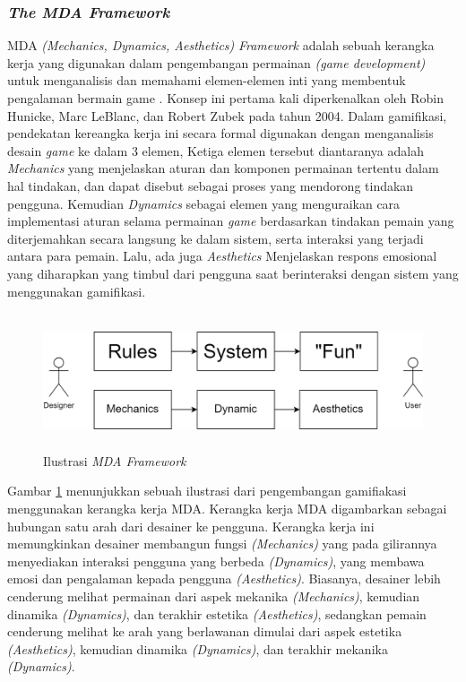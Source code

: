 \subsubsection{\textit{The MDA Framework}}
MDA \textit{(Mechanics, Dynamics, Aesthetics)} \textit{Framework} adalah sebuah kerangka kerja yang digunakan dalam pengembangan permainan
\textit{(game development)} untuk menganalisis dan memahami elemen-elemen inti yang membentuk pengalaman bermain game \cite{marisa2020gamifikasi}. 
Konsep ini pertama kali diperkenalkan oleh Robin Hunicke, Marc LeBlanc, dan Robert Zubek pada tahun 2004.
Dalam gamifikasi, pendekatan kereangka kerja ini secara formal digunakan dengan menganalisis desain \textit{game} ke dalam 3 elemen,
Ketiga elemen tersebut diantaranya adalah \textit{Mechanics} yang menjelaskan aturan dan komponen permainan tertentu dalam hal tindakan, dan dapat disebut sebagai proses yang mendorong tindakan pengguna.
Kemudian \textit{Dynamics} sebagai elemen yang menguraikan cara implementasi aturan selama permainan \textit{game} berdasarkan tindakan pemain yang diterjemahkan secara langsung ke dalam sistem, serta interaksi yang terjadi antara para pemain.
Lalu, ada juga \textit{Aesthetics} Menjelaskan respons emosional yang diharapkan yang timbul dari pengguna saat berinteraksi dengan sistem yang menggunakan gamifikasi\cite{marisa2020gamifikasi}.
\begin{figure}[H]
	\centering
	\includegraphics[height=4cm]{contents/chapter-2/images/MDA-framework.png}
	\caption{Ilustrasi \textit{MDA Framework}}
	\label{Fig:Ilustrasi MDA}
\end{figure}
Gambar \ref*{Fig:Ilustrasi MDA} menunjukkan sebuah ilustrasi dari pengembangan gamifiakasi menggunakan kerangka kerja MDA.
Kerangka kerja MDA digambarkan sebagai hubungan satu arah dari desainer ke pengguna.
Kerangka kerja ini memungkinkan desainer membangun fungsi \textit{(Mechanics)} yang pada gilirannya menyediakan interaksi pengguna yang berbeda \textit{(Dynamics)}, yang membawa emosi dan pengalaman kepada pengguna \textit{(Aesthetics)}.
Biasanya, desainer lebih cenderung melihat permainan dari aspek mekanika \textit{(Mechanics)}, kemudian dinamika \textit{(Dynamics)}, dan terakhir estetika \textit{(Aesthetics)}, 
sedangkan pemain cenderung melihat ke arah yang berlawanan dimulai dari aspek estetika \textit{(Aesthetics)}, kemudian dinamika \textit{(Dynamics)}, dan terakhir mekanika \textit{(Dynamics)}.

